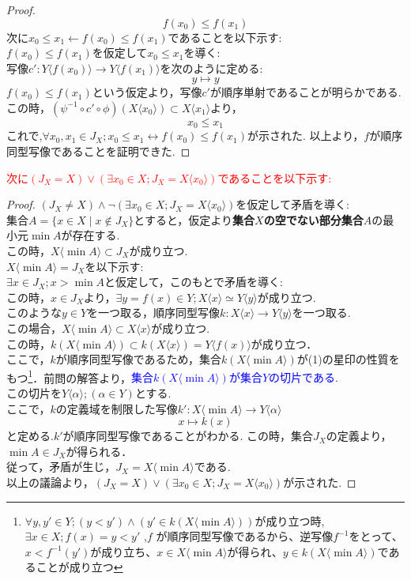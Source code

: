 \documentclass{jreport}
\begin{document}
\begin{proof}
	$$f(x_0) \le f(x_1)$$
	次に$x_0 \le x_1 \leftarrow f(x_0) \le f(x_1)$であることを以下示す:\\
$ f(x_0) \le f(x_1)$を仮定して$x_0 \le x_1$を導く:\\
写像$c':Y \langle f(x_0) \rangle \to Y\langle f(x_1) \rangle$を次のように定める:\\
$$
y \mapsto y
$$
$ f(x_0) \le f(x_1)$という仮定より，写像$c'$が順序単射であることが明らかである.\\
この時，$(\psi^{-1} \circ c' \circ \phi)(X\langle x_0 \rangle ) \subset X \langle x_1 \rangle $より，\\
$$x_0 \le x_1$$
これで,$\forall x_0,x_1 \in J_X ; x_0 \le x_1 \leftrightarrow f(x_0) \le f(x_1)$が示された.
以上より，$f$が順序同型写像であることを証明できた.
\end{proof}
\textcolor{red}{次に$(J_X = X) \lor (\exists x_0 \in X ;J_X = X \langle  x_0 \rangle)$であることを以下示す:}
\begin{proof}
$(J_X \ne X) \land \lnot (\exists x_0 \in X ;J_X = X \langle  x_0 \rangle)$を仮定して矛盾を導く:\\
集合$A=\{ x\in X \mid x \notin J_X\}$とすると，仮定より\textbf{集合$X$の空でない部分集合$A$}の最小元$\min A$が存在する.\\
この時，$X \langle \min A \rangle \subset J_X$が成り立つ.\\
$X \langle \min A \rangle = J_X$を以下示す:\\
$\exists x \in J_X ; x > \min A$と仮定して，このもとで矛盾を導く:\\
この時，$x \in J_X$より，$\exists y=f(x) \in Y; X\langle x \rangle \simeq Y \langle y \rangle$が成り立つ.\\
このような$y \in Y$を一つ取る，順序同型写像$k: X\langle x \rangle \to Y \langle y \rangle$を一つ取る.\\
この場合，$X\langle \min A \rangle \subset X\langle x \rangle$が成り立つ.\\
この時，$k(X\langle \min A \rangle) \subset k(X\langle x \rangle) = Y \langle f(x) \rangle$が成り立つ．\\
	ここで，$k$が順序同型写像であるため，集合$k(X\langle \min A \rangle)$が(1)の星印の性質をもつ\footnote{$\forall y,y' \in Y; (y<y') \land (y' \in k(X\langle \min A \rangle))$が成り立つ時,$\exists x \in X; f(x) =y < y'$ ,$f$ が順序同型写像であるから、逆写像$f^{-1}$をとって、$x<f^{-1}(y')$が成り立ち、$x \in X \langle \min A \rangle$が得られ、$y \in k(X\langle \min A \rangle)$であることが成り立つ }．前問の解答より，\textcolor{blue}{集合$k(X\langle \min A \rangle)$が集合$Y$の切片である.}\\
この切片を$Y\langle \alpha \rangle;(\alpha \in Y)$とする.\\
ここで，$k$の定義域を制限した写像$k' : X\langle \min A \rangle \to Y \langle \alpha \rangle$\\
$$ x \mapsto k(x)$$
と定める.$k'$が順序同型写像であることがわかる. この時，集合$J_X$の定義より，$\min A \in J_X$が得られる．\\
従って，矛盾が生じ，$J_X = X \langle \min A \rangle$である.\\
以上の議論より，$(J_X = X) \lor (\exists x_0 \in X; J_X = X \langle  x_0 \rangle)$が示された.
\end{proof}
\newpage
\end{document}
